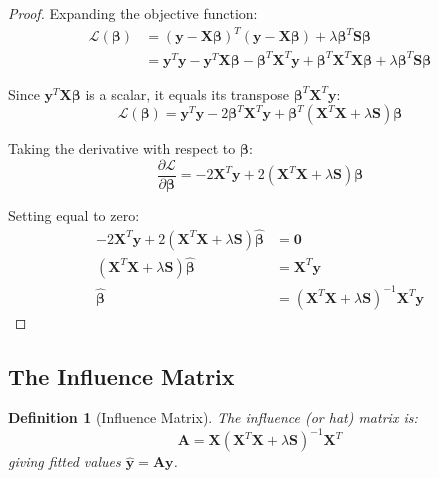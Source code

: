 \documentclass[12pt]{article}
\newtheorem{definition}{Definition}
\begin{document}
\begin{proof}
Expanding the objective function:
\begin{align}
\mathcal{L}(\bm{\beta}) &= (\mathbf{y} - \mathbf{X}\bm{\beta})^T(\mathbf{y} - \mathbf{X}\bm{\beta}) + \lambda \bm{\beta}^T \mathbf{S} \bm{\beta} \\
&= \mathbf{y}^T\mathbf{y} - \mathbf{y}^T\mathbf{X}\bm{\beta} - \bm{\beta}^T\mathbf{X}^T\mathbf{y} + \bm{\beta}^T\mathbf{X}^T\mathbf{X}\bm{\beta} + \lambda \bm{\beta}^T \mathbf{S} \bm{\beta}
\end{align}

Since $\mathbf{y}^T\mathbf{X}\bm{\beta}$ is a scalar, it equals its transpose $\bm{\beta}^T\mathbf{X}^T\mathbf{y}$:
\begin{equation}
\mathcal{L}(\bm{\beta}) = \mathbf{y}^T\mathbf{y} - 2\bm{\beta}^T\mathbf{X}^T\mathbf{y} + \bm{\beta}^T(\mathbf{X}^T\mathbf{X} + \lambda\mathbf{S})\bm{\beta}
\end{equation}

Taking the derivative with respect to $\bm{\beta}$:
\begin{equation}
\frac{\partial \mathcal{L}}{\partial \bm{\beta}} = -2\mathbf{X}^T\mathbf{y} + 2(\mathbf{X}^T\mathbf{X} + \lambda\mathbf{S})\bm{\beta}
\end{equation}

Setting equal to zero:
\begin{align}
-2\mathbf{X}^T\mathbf{y} + 2(\mathbf{X}^T\mathbf{X} + \lambda\mathbf{S})\hat{\bm{\beta}} &= \mathbf{0} \\
(\mathbf{X}^T\mathbf{X} + \lambda\mathbf{S})\hat{\bm{\beta}} &= \mathbf{X}^T\mathbf{y} \\
\hat{\bm{\beta}} &= (\mathbf{X}^T\mathbf{X} + \lambda\mathbf{S})^{-1}\mathbf{X}^T\mathbf{y}
\end{align}
\end{proof}

\subsection{The Influence Matrix}

\begin{definition}[Influence Matrix]
The influence (or hat) matrix is:
\begin{equation}
\mathbf{A} = \mathbf{X}(\mathbf{X}^T\mathbf{X} + \lambda\mathbf{S})^{-1}\mathbf{X}^T
\end{equation}
giving fitted values $\hat{\mathbf{y}} = \mathbf{A}\mathbf{y}$.
\end{definition}
\end{document}
